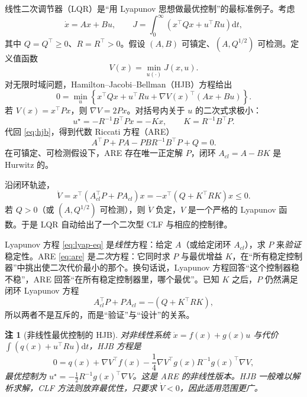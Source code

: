 \documentclass[11pt, a4paper, UTF8, fontset=none]{ctexart}
\theoremstyle{cnthm}
\newtheorem{remark}{注}[section]
\begin{document}
线性二次调节器（LQR）是“用 Lyapunov 思想做最优控制”的最标准例子。考虑
\begin{equation}
  \dot x=Ax+Bu,\qquad
  J=\int_0^\infty\left(x^\top Qx+u^\top Ru\right)\mathrm{d}t,
  \label{eq:lqr}
\end{equation}
其中 $Q=Q^\top\ge0$、$R=R^\top>0$。假设 $(A,B)$ 可镇定、$(A,Q^{1/2})$ 可检测。定义值函数
\begin{equation}
  V(x)=\min_{u(\cdot)}J(x,u).
\end{equation}
对无限时域问题，Hamilton--Jacobi--Bellman（HJB）方程给出
\begin{equation}
  0=\min_{u}\left\{x^\top Qx+u^\top Ru+\nabla V(x)^\top(Ax+Bu)\right\}.
  \label{eq:hjb}
\end{equation}
若 $V(x)=x^\top Px$，则 $\nabla V=2Px$。对括号内关于 $u$ 的二次式求极小：
\begin{equation}
  u^\star=-R^{-1}B^\top Px=-Kx,\qquad K=R^{-1}B^\top P.
  \label{eq:lqr-gain}
\end{equation}
代回 \eqref{eq:hjb}，得到代数 Riccati 方程（ARE）
\begin{equation}
  A^\top P+PA-PBR^{-1}B^\top P+Q=0.
  \label{eq:are}
\end{equation}
在可镇定、可检测假设下，ARE 存在唯一正定解 $P$，闭环 $A_{cl}=A-BK$ 是 Hurwitz 的。

沿闭环轨迹，
\begin{equation}
  \dot V=x^\top(A_{cl}^\top P+PA_{cl})x
  =-x^\top\left(Q+K^\top RK\right)x\le0.
  \label{eq:lqr-dotV}
\end{equation}
若 $Q>0$（或 $(A,Q^{1/2})$ 可检测），则 $\dot V$ 负定，$V$ 是一个严格的 Lyapunov 函数。于是 LQR 自动给出了一个二次型 CLF 与相应的控制律。

\begin{keybox}
Lyapunov 方程 \eqref{eq:lyap-eq} 是\emph{线性}方程：给定 $A$（或给定闭环 $A_{cl}$），求 $P$ 来\emph{验证}稳定性。ARE \eqref{eq:are} 是\emph{二次}方程：它同时求 $P$ 与最优增益 $K$，在“所有稳定控制器”中挑出使二次代价最小的那个。换句话说，Lyapunov 方程回答“这个控制器稳不稳”，ARE 回答“在所有稳定控制器里，哪个最优”。已知 $K$ 之后，$P$ 仍然满足闭环 Lyapunov 方程
\begin{equation}
  A_{cl}^\top P+PA_{cl}=-(Q+K^\top RK),
\end{equation}
所以两者不是互斥的，而是“验证”与“设计”的关系。
\end{keybox}

\begin{remark}[非线性最优控制的 HJB]
对非线性系统 $\dot x=f(x)+g(x)u$ 与代价 $\int(q(x)+u^\top Ru)\mathrm{d}t$，HJB 方程是
\begin{equation}
  0=q(x)+\nabla V^\top f(x)-\frac14\nabla V^\top g(x)R^{-1}g(x)^\top\nabla V,
\end{equation}
最优控制为 $u^\star=-\frac12R^{-1}g(x)^\top\nabla V$。这是 ARE 的非线性版本。HJB 一般难以解析求解，CLF 方法则放弃最优性，只要求 $\dot V<0$，因此适用范围更广。
\end{remark}
\end{document}
